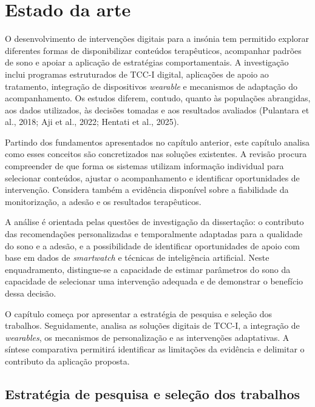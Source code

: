 % 
\chapter{Estado da arte} %
\label{chap:Chapter3} %

%

O desenvolvimento de intervenções digitais para a insónia tem permitido explorar diferentes formas de disponibilizar conteúdos terapêuticos, acompanhar padrões de sono e apoiar a aplicação de estratégias comportamentais. A investigação inclui programas estruturados de TCC-I digital, aplicações de apoio ao tratamento, integração de dispositivos \textit{wearable} e mecanismos de adaptação do acompanhamento. Os estudos diferem, contudo, quanto às populações abrangidas, aos dados utilizados, às decisões tomadas e aos resultados avaliados (Pulantara et al., 2018; Aji et al., 2022; Hentati et al., 2025).

Partindo dos fundamentos apresentados no capítulo anterior, este capítulo analisa como esses conceitos são concretizados nas soluções existentes. A revisão procura compreender de que forma os sistemas utilizam informação individual para selecionar conteúdos, ajustar o acompanhamento e identificar oportunidades de intervenção. Considera também a evidência disponível sobre a fiabilidade da monitorização, a adesão e os resultados terapêuticos.

A análise é orientada pelas questões de investigação da dissertação: o contributo das recomendações personalizadas e temporalmente adaptadas para a qualidade do sono e a adesão, e a possibilidade de identificar oportunidades de apoio com base em dados de \textit{smartwatch} e técnicas de inteligência artificial. Neste enquadramento, distingue-se a capacidade de estimar parâmetros do sono da capacidade de selecionar uma intervenção adequada e de demonstrar o benefício dessa decisão.

O capítulo começa por apresentar a estratégia de pesquisa e seleção dos trabalhos. Seguidamente, analisa as soluções digitais de TCC-I, a integração de \textit{wearables}, os mecanismos de personalização e as intervenções adaptativas. A síntese comparativa permitirá identificar as limitações da evidência e delimitar o contributo da aplicação proposta.


\section{Estratégia de pesquisa e seleção dos trabalhos} 
\label{sec:chap3_estrategiaPesquisa} %


